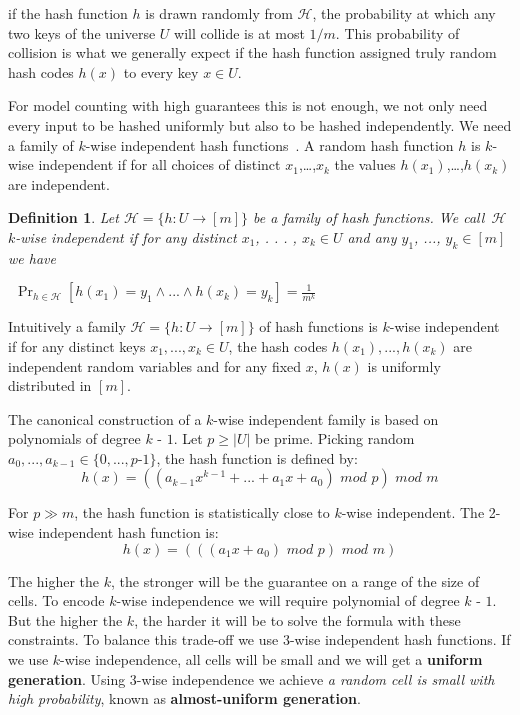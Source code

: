 \documentclass{article}
\newtheorem{definition}{Definition}
\newcommand{\hash}{$\mathcal{H}$}
\begin{document}
if the hash function $h$ is drawn randomly from \hash, the probability at which any two keys of the universe $U$ will collide is at most $1/m$.
%
This probability of collision is what we generally expect if the hash function assigned truly random hash codes $h(x)$ to every key $x \in U$.

For model counting with high guarantees this is not enough, we not only need every input to be hashed uniformly but also to be hashed independently. We need a family of $k$-wise independent hash functions~\cite{DBLP:conf/focs/WegmanC79}.
%
A random hash function $h$ is $k$-wise independent if for all choices of distinct $x_1$,…,$x_k$ the values $h(x_1)$,…,$h(x_k)$ are independent.
\begin{definition}
	Let $\mathcal{H}=\{h: U \to [m]\}$ be a family of hash functions. We call~$\mathcal{H}$ \emph{$k$-wise independent} if for any distinct $x_1$, . . . , $x_k \in U$ and any $y_1$, ..., $y_k \in [m]$ we have

	$~~\Pr_{h\in \mathcal{H}}
	[h(x_1) = y_1 \land ... \land h(x_k) = y_k] = \frac {1}
	{m^
		k}$
\end{definition}

Intuitively a family $\mathcal{H} = \{h : U \to [m]\}$ of hash functions
is $k$-wise independent if for any distinct keys $x_1, ..., x_k \in U$, the hash codes $h(x_1), ..., h(x_k)$ are independent random variables and for any fixed $x$, $h(x)$ is uniformly distributed in $[m]$.

The canonical construction of a $k$-wise independent family is based on polynomials
of degree $k$ - $1$. Let $p \geq |U|$ be prime. Picking random $a_0,...,a_{k - 1} \in \{0, . . . , p$-$ 1\}$,
the hash function is defined by:
\[ h(x) = ( ( a_{k-1} x^ {k - 1} + ... + a_1 x + a_0) \,\, mod \,\, p) \,\, mod \,\,  m\]


For $p \gg	 m$, the hash function is statistically close to $k$-wise independent. The 2-wise independent hash function is:
\[ h(x) = (((a_1 x + a_0) \,\, mod \,\, p) \,\, mod \,\, m ) \]


The higher the $k$, the stronger will be the guarantee on a range of the size of cells. 
%
To encode $k$-wise independence we will require polynomial of degree $k$ - $1$.
%
But the higher the $k$, the harder it will be to solve the formula with these constraints. 
%
To balance this trade-off we use 3-wise independent hash functions.
%
If we use $k$-wise independence, all cells will be small and we will get a \textbf{uniform generation}. 
%
Using $3$-wise independence we achieve \emph{a random cell is small with high probability}, known as \textbf{almost-uniform generation}.
\end{document}
